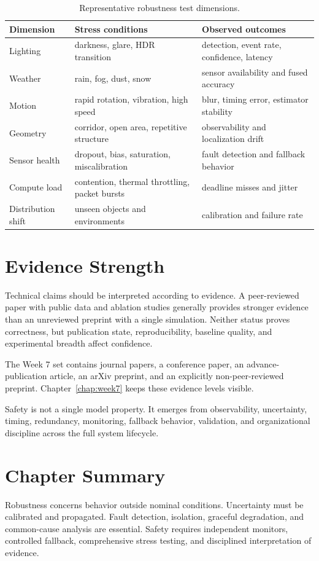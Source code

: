 \begin{table}[H]
\centering
\caption{Representative robustness test dimensions.}
\label{tab:robustness-matrix}
\begin{tabularx}{\textwidth}{@{}p{3.0cm}X X@{}}
\toprule
\textbf{Dimension} & \textbf{Stress conditions} & \textbf{Observed outcomes} \\
\midrule
Lighting & darkness, glare, HDR transition & detection, event rate, confidence, latency \\
Weather & rain, fog, dust, snow & sensor availability and fused accuracy \\
Motion & rapid rotation, vibration, high speed & blur, timing error, estimator stability \\
Geometry & corridor, open area, repetitive structure & observability and localization drift \\
Sensor health & dropout, bias, saturation, miscalibration & fault detection and fallback behavior \\
Compute load & contention, thermal throttling, packet bursts & deadline misses and jitter \\
Distribution shift & unseen objects and environments & calibration and failure rate \\
\bottomrule
\end{tabularx}
\end{table}

\section{Evidence Strength}

Technical claims should be interpreted according to evidence. A peer-reviewed paper with public data and ablation studies generally provides stronger evidence than an unreviewed preprint with a single simulation. Neither status proves correctness, but publication state, reproducibility, baseline quality, and experimental breadth affect confidence.

The Week 7 set contains journal papers, a conference paper, an advance-publication article, an arXiv preprint, and an explicitly non-peer-reviewed preprint. Chapter~\ref{chap:week7} keeps these evidence levels visible.

\begin{keyinsight}
Safety is not a single model property. It emerges from observability, uncertainty, timing, redundancy, monitoring, fallback behavior, validation, and organizational discipline across the full system lifecycle.
\end{keyinsight}

\section{Chapter Summary}

Robustness concerns behavior outside nominal conditions. Uncertainty must be calibrated and propagated. Fault detection, isolation, graceful degradation, and common-cause analysis are essential. Safety requires independent monitors, controlled fallback, comprehensive stress testing, and disciplined interpretation of evidence.
